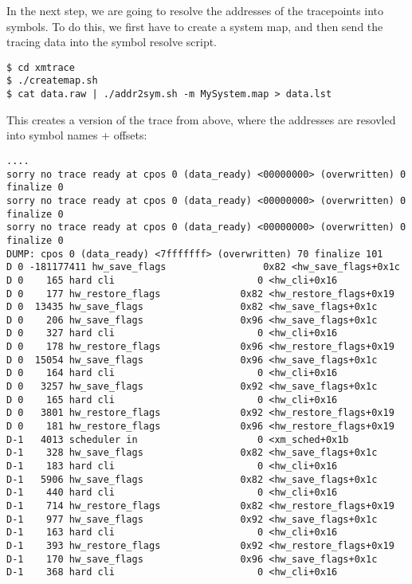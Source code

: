 In the next step, we are going to resolve the addresses of the tracepoints into symbols. To do this, we first have
to create a system map, and then send the tracing data into the symbol resolve script.\\

\begin{verbatim}
$ cd xmtrace
$ ./createmap.sh
$ cat data.raw | ./addr2sym.sh -m MySystem.map > data.lst
\end{verbatim}

This creates a version of the trace from above, where the addresses are resovled into symbol names + offsets:
 
\begin{verbatim}
....
sorry no trace ready at cpos 0 (data_ready) <00000000> (overwritten) 0 finalize 0
sorry no trace ready at cpos 0 (data_ready) <00000000> (overwritten) 0 finalize 0
sorry no trace ready at cpos 0 (data_ready) <00000000> (overwritten) 0 finalize 0
DUMP: cpos 0 (data_ready) <7fffffff> (overwritten) 70 finalize 101
D 0 -181177411 hw_save_flags                 0x82 <hw_save_flags+0x1c 
D 0    165 hard cli                         0 <hw_cli+0x16 
D 0    177 hw_restore_flags              0x82 <hw_restore_flags+0x19 
D 0  13435 hw_save_flags                 0x82 <hw_save_flags+0x1c 
D 0    206 hw_save_flags                 0x96 <hw_save_flags+0x1c 
D 0    327 hard cli                         0 <hw_cli+0x16 
D 0    178 hw_restore_flags              0x96 <hw_restore_flags+0x19 
D 0  15054 hw_save_flags                 0x96 <hw_save_flags+0x1c 
D 0    164 hard cli                         0 <hw_cli+0x16 
D 0   3257 hw_save_flags                 0x92 <hw_save_flags+0x1c 
D 0    165 hard cli                         0 <hw_cli+0x16 
D 0   3801 hw_restore_flags              0x92 <hw_restore_flags+0x19 
D 0    181 hw_restore_flags              0x96 <hw_restore_flags+0x19 
D-1   4013 scheduler in                     0 <xm_sched+0x1b 
D-1    328 hw_save_flags                 0x82 <hw_save_flags+0x1c 
D-1    183 hard cli                         0 <hw_cli+0x16 
D-1   5906 hw_save_flags                 0x82 <hw_save_flags+0x1c 
D-1    440 hard cli                         0 <hw_cli+0x16 
D-1    714 hw_restore_flags              0x82 <hw_restore_flags+0x19 
D-1    977 hw_save_flags                 0x92 <hw_save_flags+0x1c 
D-1    163 hard cli                         0 <hw_cli+0x16 
D-1    393 hw_restore_flags              0x92 <hw_restore_flags+0x19 
D-1    170 hw_save_flags                 0x96 <hw_save_flags+0x1c 
D-1    368 hard cli                         0 <hw_cli+0x16 

\end{verbatim}
